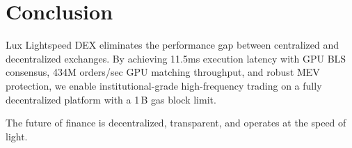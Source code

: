 \section{Conclusion}


Lux Lightspeed DEX eliminates the performance gap between centralized and decentralized exchanges. By achieving 11.5ms execution latency with GPU BLS consensus, 434M orders/sec GPU matching throughput, and robust MEV protection, we enable institutional-grade high-frequency trading on a fully decentralized platform with a 1\,B gas block limit.

The future of finance is decentralized, transparent, and operates at the speed of light.

